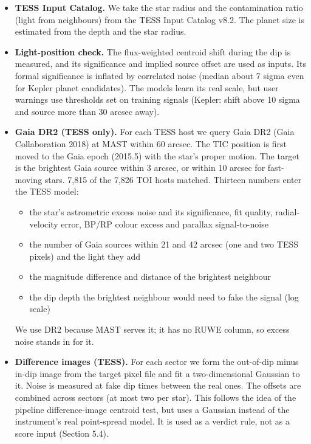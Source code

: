 \documentclass[fleqn,usenatbib]{mnras}
\providecommand{\tightlist}{\setlength{\itemsep}{0pt}\setlength{\parskip}{0pt}}
\begin{document}
\begin{itemize}
\tightlist
\item
  \textbf{TESS Input Catalog.} We take the star radius and the contamination ratio (light from neighbours) from the TESS Input Catalog v8.2. The planet size is estimated from the depth and the star radius.
\item
  \textbf{Light-position check.} The flux-weighted centroid shift during the dip is measured, and its significance and implied source offset are used as inputs. Its formal significance is inflated by correlated noise (median about 7 sigma even for Kepler planet candidates). The models learn its real scale, but user warnings use thresholds set on training signals (Kepler: shift above 10 sigma and source more than 30 arcsec away).
\item
  \textbf{Gaia DR2 (TESS only).} For each TESS host we query Gaia DR2 (Gaia Collaboration 2018) at MAST within 60 arcsec. The TIC position is first moved to the Gaia epoch (2015.5) with the star's proper motion. The target is the brightest Gaia source within 3 arcsec, or within 10 arcsec for fast-moving stars. 7,815 of the 7,826 TOI hosts matched. Thirteen numbers enter the TESS model:

  \begin{itemize}
  \tightlist
  \item
    the star's astrometric excess noise and its significance, fit quality, radial-velocity error, BP/RP colour excess and parallax signal-to-noise
  \item
    the number of Gaia sources within 21 and 42 arcsec (one and two TESS pixels) and the light they add
  \item
    the magnitude difference and distance of the brightest neighbour
  \item
    the dip depth the brightest neighbour would need to fake the signal (log scale)
  \end{itemize}

  We use DR2 because MAST serves it; it has no RUWE column, so excess noise stands in for it.
\item
  \textbf{Difference images (TESS).} For each sector we form the out-of-dip minus in-dip image from the target pixel file and fit a two-dimensional Gaussian to it. Noise is measured at fake dip times between the real ones. The offsets are combined across sectors (at most two per star). This follows the idea of the pipeline difference-image centroid test, but uses a Gaussian instead of the instrument's real point-spread model. It is used as a verdict rule, not as a score input (Section 5.4).
\end{itemize}
\end{document}
